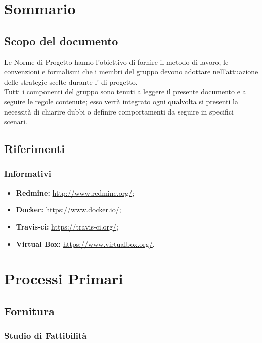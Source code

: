\documentclass{scalatekids-article}
\begin{document}
\section{Sommario}

\subsection{Scopo del documento}

Le Norme di Progetto hanno l'obiettivo di fornire il metodo di lavoro, le
convenzioni e formalismi che i membri del gruppo devono adottare nell'attuazione
delle strategie scelte durante l' di progetto. \\
Tutti i componenti del gruppo sono tenuti a leggere il presente documento e a seguire
le regole contenute; esso verrà integrato ogni qualvolta si presenti la necessità di
chiarire dubbi o definire comportamenti da seguire in specifici scenari.

\prodPurpose \glossExpl

\subsection{Riferimenti}

\subsubsection{Informativi}

\begin{itemize}
    \item\textbf{Redmine:} \url{http://www.redmine.org/};
    \item\textbf{Docker:} \url{https://www.docker.io/};
    \item\textbf{Travis-ci:} \url{https://travis-ci.org/};
    \item\textbf{Virtual Box:} \url{https://www.virtualbox.org/}.
\end{itemize}

\section{Processi Primari}

\subsection{Fornitura}

\subsubsection{Studio di Fattibilità}
\end{document}
